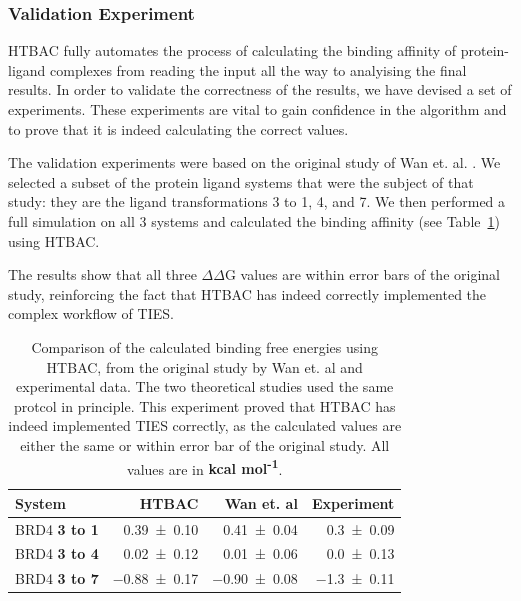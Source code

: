

\subsubsection{Validation Experiment}

HTBAC fully automates the process of calculating the binding affinity of
protein-ligand complexes from reading the input all the way to analyising the
final results. In order to validate the correctness of the results, we have
devised a set of experiments. These experiments are vital to gain confidence
in the algorithm and to prove that it is indeed calculating the correct values.

The validation experiments were based on the original study of Wan et. al.
\cite{Wan2017brd4}. We selected a subset of the protein ligand systems that
were the subject of that study: they are the ligand transformations 3 to 1, 4,
and 7. We then performed a full simulation on all 3 systems and calculated the
binding affinity (see Table~\ref{tab:exp2}) using HTBAC.

The results show that all three $\Delta \Delta$G values are within error bars
of the original study, reinforcing the fact that HTBAC has indeed correctly
implemented the complex workflow of TIES.

\begin{table}
  \centering
  \begin{tabular}{l@{\hskip 1in}r@{\hskip 0.2in}r@{\hskip 0.2in}r}
    \toprule
    System & HTBAC & Wan et. al & Experiment \\
    \midrule
    BRD4 \textbf{3 to 1} & \num{0.39 +- 0.10} &   \num{0.41 +- 0.04} &  \num{0.3 +- 0.09} \\
    BRD4 \textbf{3 to 4} & \num{0.02 +- 0.12} &   \num{0.01 +- 0.06} &  \num{0.0 +- 0.13} \\
    BRD4 \textbf{3 to 7} & \num{-0.88 +- 0.17} &  \num{-0.90 +- 0.08} & \num{-1.3 +- 0.11} \\
    \bottomrule
  \end{tabular}

  \caption{Comparison of the calculated binding free energies using HTBAC, from
  the original study by Wan et. al and experimental data. The two theoretical
  studies used the same protcol in principle. This experiment proved that HTBAC
  has indeed implemented TIES correctly, as the calculated values are either
  the same or within error bar of the original study. All values are in
  \textbf{kcal mol\textsuperscript{-1}}.}
  \label{tab:exp2}


\end{table}

